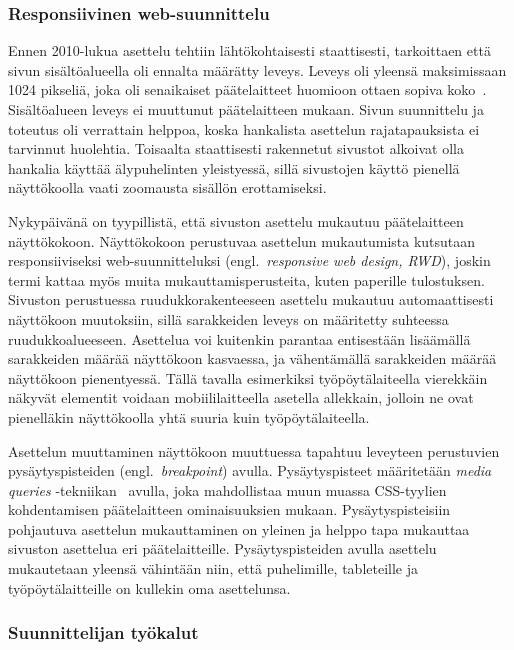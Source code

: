 \documentclass[finnish, 12pt, a4paper, elec, utf8, a-1b, online]{aaltothesis}
\begin{document}
\subsubsection{Responsiivinen web-suunnittelu}\label{responsive-web-design}

Ennen 2010-lukua asettelu tehtiin lähtökohtaisesti staattisesti, tarkoittaen
että sivun sisältöalueella oli ennalta määrätty leveys. Leveys oli yleensä
maksimissaan 1024 pikseliä, joka oli senaikaiset päätelaitteet huomioon ottaen sopiva
koko~\cite{viite?}. Sisältöalueen leveys ei muuttunut päätelaitteen mukaan. Sivun suunnittelu
ja toteutus oli verrattain helppoa, koska hankalista asettelun rajatapauksista
ei tarvinnut huolehtia. Toisaalta staattisesti rakennetut sivustot alkoivat olla
hankalia käyttää älypuhelinten yleistyessä, sillä sivustojen käyttö pienellä
näyttökoolla vaati zoomausta sisällön erottamiseksi.

Nykypäivänä on tyypillistä, että sivuston asettelu mukautuu päätelaitteen
näyttökokoon. Näyttökokoon perustuvaa asettelun mukautumista kutsutaan
responsiiviseksi web-suunnitteluksi (engl.~\textit{responsive web design, RWD}),
joskin termi kattaa myös muita mukauttamisperusteita, kuten paperille
tulostuksen. Sivuston perustuessa ruudukkorakenteeseen asettelu mukautuu
automaattisesti näyttökoon muutoksiin, sillä sarakkeiden leveys on määritetty
suhteessa ruudukkoalueeseen. Asettelua voi kuitenkin parantaa entisestään
lisäämällä sarakkeiden määrää näyttökoon kasvaessa, ja vähentämällä sarakkeiden
määrää näyttökoon pienentyessä. Tällä tavalla esimerkiksi työpöytälaiteella
vierekkäin näkyvät elementit voidaan mobiililaitteella asetella allekkain,
jolloin ne ovat pienelläkin näyttökoolla yhtä suuria kuin työpöytälaiteella.

Asettelun muuttaminen näyttökoon muuttuessa tapahtuu leveyteen perustuvien
pysäytyspisteiden (engl.~\textit{breakpoint}) avulla. Pysäytyspisteet
määritetään \textit{media queries} -tekniikan~\cite{Rivoal:12:MQ} avulla, joka
mahdollistaa muun muassa CSS-tyylien kohdentamisen päätelaitteen ominaisuuksien
mukaan. Pysäytyspisteisiin pohjautuva asettelun mukauttaminen on yleinen ja
helppo tapa mukauttaa sivuston asettelua eri päätelaitteille. Pysäytyspisteiden
avulla asettelu mukautetaan yleensä vähintään niin, että puhelimille,
tableteille ja työpöytälaitteille on kullekin oma asettelunsa.

\subsubsection{Suunnittelijan työkalut}
\end{document}
